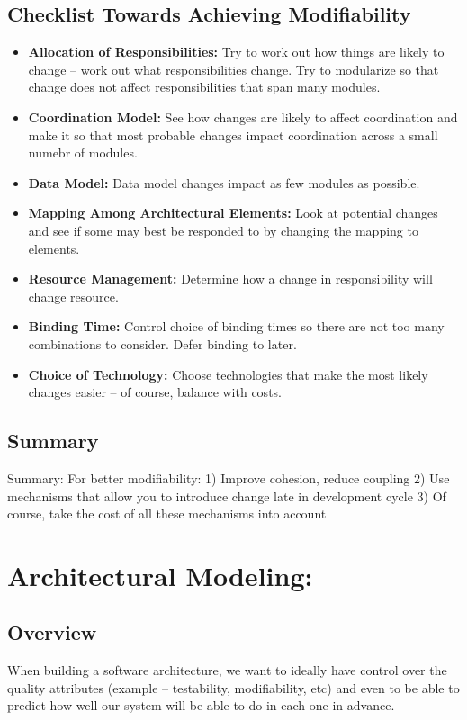 \documentclass{report}
\begin{document}
\section{Checklist Towards Achieving Modifiability}
\begin{itemize}
\item
\textbf{Allocation of Responsibilities:}
Try to work out how things are likely to change – work out what responsibilities change.
Try to modularize so that change does not affect responsibilities that span many modules.

\item
\textbf{Coordination Model:}
See how changes are likely to affect coordination and make it so that most probable changes impact coordination across a small numebr of modules.  

\item
\textbf{Data Model:}
Data model changes impact as few modules as possible.

\item
\textbf{Mapping Among Architectural Elements:}
Look at potential changes and see if some may best be responded to by changing the mapping to elements.

\item
\textbf{Resource Management:}
Determine how a change in responsibility will change resource.

\item
\textbf{Binding Time:}
Control choice of binding times so there are not too many combinations to consider. Defer binding to later.

\item
\textbf{Choice of Technology:} 
Choose technologies that make the most likely changes easier – of course, balance with costs.
\end{itemize}

\section{Summary}
Summary:
For better modifiability:
1) Improve cohesion, reduce coupling
2) Use mechanisms that allow you to introduce change late in development cycle
3) Of course, take the cost of all these mechanisms into account

\chapter{Architectural Modeling:}
\section{Overview}
When building a software architecture, we want to ideally have control over the quality attributes (example – testability, modifiability, etc) and even to be able to predict how well our system will be able to do in each one in advance. 
\end{document}
